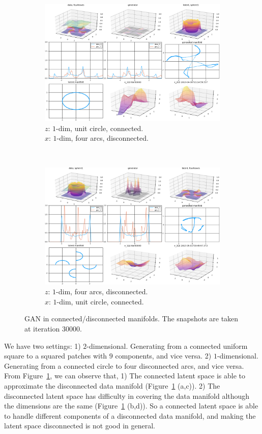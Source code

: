 \begin{figure}[ht]
\begin{subfigure}[t]{0.45\textwidth}
        \includegraphics[width=\linewidth]{"fig/sphere1_fourleaves_00030000"}
        \caption{$z$: $1$-dim, unit circle, connected.\\
            $x$: $1$-dim, four arcs, disconnected.}
    \end{subfigure}
    ~
    \begin{subfigure}[t]{0.45\textwidth}
        \includegraphics[width=\linewidth]{"fig/fourleaves_sphere1_00030000"}
        \caption{$z$: $1$-dim, four arcs, disconnected.\\
            $x$: $1$-dim, unit circle, connected.}
    \end{subfigure}
    \caption{\small
        GAN in connected/disconnected manifolds.
        The snapshots are taken at iteration $30000$.
        }
    \label{fig:conn}
\end{figure}

We have two settings:
1) $2$-dimensional.
Generating from a connected uniform square to a squared patches
with $9$ components,
and vice versa.
2) $1$-dimensional.
Generating from a connected circle to four disconnected arcs,
and vice versa.
From Figure~\ref{fig:conn},
we can observe that,
1) The connected latent space is able to approximate the disconnected
data manifold (Figure~\ref{fig:conn} (a,c)).
2) The disconnected latent space has difficulty in covering
the data manifold although the dimensions are the same
(Figure~\ref{fig:conn} (b,d)).
So a connected latent space is able to handle different components
of a disconnected data manifold,
and making the latent space disconnected is not good in general.
